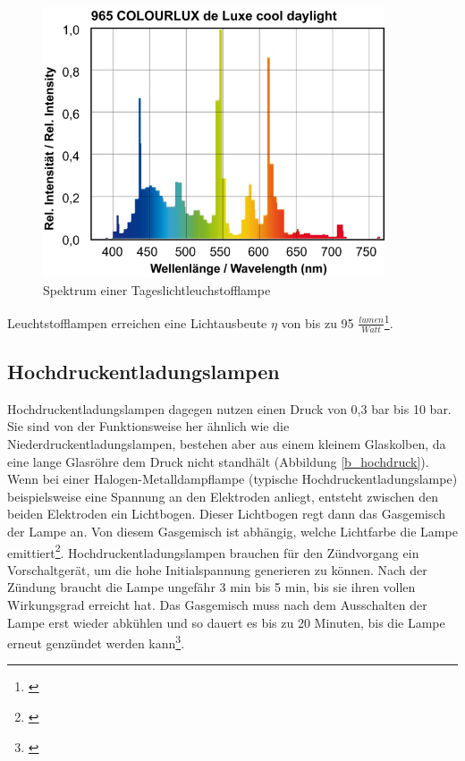 \begin{figure}[H]     %
\centering
\includegraphics[width=0.9\textwidth]{bilder/leuchtstoffspec} 
\caption {Spektrum einer Tageslichtleuchstofflampe\protect\footnotemark}\label{b_leuchtstoffspec}
\end{figure}

\noindent Leuchtstofflampen erreichen eine Lichtausbeute $\eta$ von bis zu 95 $\frac{lumen}{Watt}$\footnote{\cite[35]{greule}}.\\

\subsection{Hochdruckentladungslampen}
\noindent Hochdruckentladungslampen dagegen nutzen einen Druck von 0,3 bar bis 10 bar. Sie sind von der Funktionsweise her ähnlich wie die Niederdruckentladungslampen, bestehen aber aus einem kleinem Glaskolben, da eine lange Glasröhre dem Druck nicht standhält (Abbildung \ref{b_hochdruck}).\\
\noindent Wenn bei einer Halogen-Metalldampflampe (typische Hochdruckentladungslampe) beispielsweise eine Spannung an den Elektroden anliegt, entsteht zwischen den beiden Elektroden ein Lichtbogen. Dieser Lichtbogen regt dann das Gasgemisch der Lampe an. Von diesem Gasgemisch ist abhängig, welche Lichtfarbe die Lampe emittiert\footnote{\cite[129]{ris}}.
Hochdruckentladungslampen brauchen für den Zündvorgang ein Vorschaltgerät, um die hohe Initialspannung generieren zu können. Nach der Zündung braucht die Lampe ungefähr 3 min bis 5 min, bis sie ihren vollen Wirkungsgrad erreicht hat. Das Gasgemisch muss nach dem Ausschalten der Lampe erst wieder abkühlen und so dauert es bis zu 20 Minuten, bis die Lampe erneut genzündet werden kann\footnote{\cite[147]{mueller}}.

